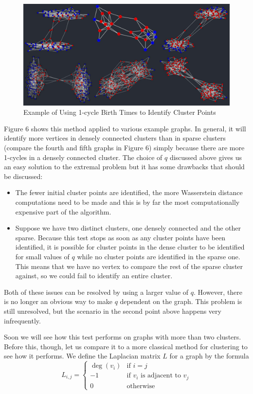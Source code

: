 \documentclass[12pt,a4paper]{amsart}
\numberwithin{equation}{section}
\theoremstyle{plain}
\theoremstyle{definition}
\begin{document}
\begin{figure}[h]
	\centering
	\caption{Example of Using 1-cycle Birth Times to Identify Cluster Points}
	\includegraphics[scale=0.55]{InitialClusterPoints.jpg}
\end{figure}

\newpage

Figure 6 shows this method applied to various example graphs. In general, it will identify more vertices in densely connected clusters than in sparse clusters (compare the fourth and fifth graphs in Figure 6) simply because there are more 1-cycles in a densely connected cluster. The choice of $q$ discussed above gives us an easy solution to the extremal problem but it has some drawbacks that should be discussed: 
\begin{itemize}
	\item The fewer initial cluster points are identified, the more Wasserstein distance computations need to be made and this is by far the most computationally expensive part of the algorithm.
	\item Suppose we have two distinct clusters, one densely connected and the other sparse. Because this test stops as soon as any cluster points have been identified, it is possible for cluster points in the dense cluster to be identified for small values of $q$ while no cluster points are identified in the sparse one. This means that we have no vertex to compare the rest of the sparse cluster against, so we could fail to identify an entire cluster.
\end{itemize}

Both of these issues can be resolved by using a larger value of $q$. However, there is no longer an obvious way to make $q$ dependent on the graph. This problem is still unresolved, but the scenario in the second point above happens very infrequently.

Soon we will see how this test performs on graphs with more than two clusters. Before this, though, let us compare it to a more classical method for clustering to see how it performs. We define the Laplacian matrix $L$ for a graph by the formula
\[ L_{i,j} = \begin{cases} \deg(v_i) & \mbox{if $i=j$} \\ -1 & \mbox{if $v_i$ is adjacent to $v_j$} \\ 0 & \mbox{otherwise} \end{cases} \]
\end{document}
